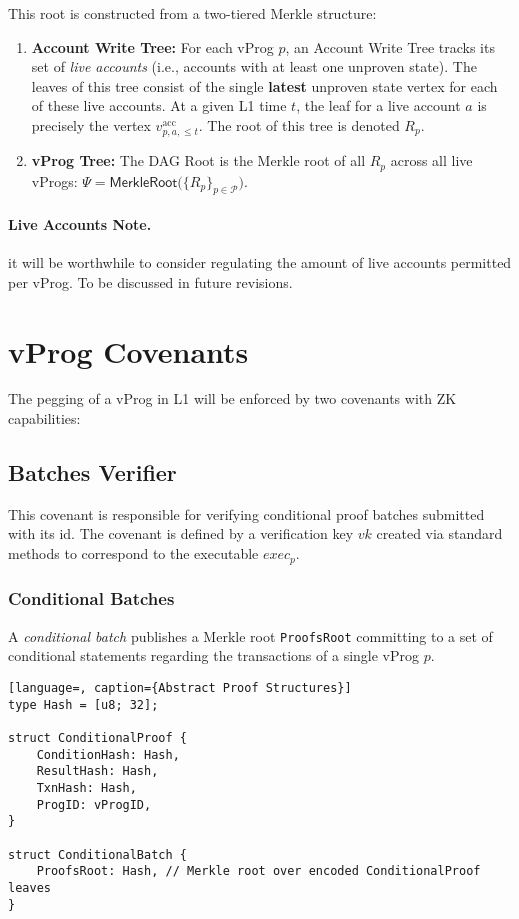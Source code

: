 \documentclass[onecolumn, 9pt, a4paper]{extarticle}
\begin{document}
This root is constructed from a two-tiered Merkle structure:
\begin{enumerate}[nosep]
  \item \textbf{Account Write Tree:} For each vProg $p$, an Account Write Tree tracks its set of \emph{live accounts} (i.e., accounts with at least one unproven state). The leaves of this tree consist of the single \textbf{latest} unproven state vertex for each of these live accounts. At a given L1 time $t$, the leaf for a live account $a$ is precisely the vertex $v^{\mathrm{acc}}_{p,a,\leq t}$. The root of this tree is denoted $R_p$.
  \item \textbf{vProg Tree:} The DAG Root is the Merkle root of all $R_p$ across all live vProgs: $\Psi=\mathsf{MerkleRoot}\big(\{R_p\}_{p\in \mathcal{P}}\big)$.
\end{enumerate}

\paragraph{Live Accounts Note.} it will be worthwhile to consider regulating the amount of live accounts permitted per vProg. To be discussed in future revisions.


\section{vProg Covenants}
The pegging of a vProg in L1 will be enforced by two covenants with ZK capabilities:

\subsection{Batches Verifier}
This covenant is responsible for verifying conditional proof batches submitted with its id. The covenant is defined by a verification key $vk$ created via standard methods to correspond to the executable $exec_p$.

\subsubsection{Conditional Batches}\label{sec:conditional_batch_verification}
A \emph{conditional batch} publishes a Merkle root \texttt{ProofsRoot} committing to a set of conditional statements regarding the transactions of a single vProg $p$.

\begin{lstlisting}[language=, caption={Abstract Proof Structures}]
type Hash = [u8; 32];

struct ConditionalProof {
    ConditionHash: Hash,
    ResultHash: Hash,
    TxnHash: Hash,
    ProgID: vProgID,
}

struct ConditionalBatch {
    ProofsRoot: Hash, // Merkle root over encoded ConditionalProof leaves
}
\end{lstlisting}
\end{document}
